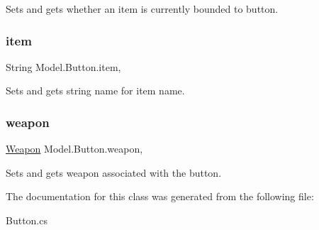 Sets and gets whether an item is currently bounded to button. \hypertarget{class_model_1_1_button_a9aff2e95ee3d23e877593e32a40e99bf}{}\label{class_model_1_1_button_a9aff2e95ee3d23e877593e32a40e99bf} 
\subsubsection{\texorpdfstring{item}{item}}
{\footnotesize\ttfamily String Model.\+Button.\+item\hspace{0.3cm}{\ttfamily [get]}, {\ttfamily [set]}}

Sets and gets string name for item name. \hypertarget{class_model_1_1_button_af435b2d384ae925bfeb6bda7c49db402}{}\label{class_model_1_1_button_af435b2d384ae925bfeb6bda7c49db402} 
\subsubsection{\texorpdfstring{weapon}{weapon}}
{\footnotesize\ttfamily \hyperlink{interface_model_1_1_weapon_module_1_1_weapon}{Weapon} Model.\+Button.\+weapon\hspace{0.3cm}{\ttfamily [get]}, {\ttfamily [set]}}

Sets and gets weapon associated with the button. 

The documentation for this class was generated from the following file\+:\begin{DoxyCompactItemize}
\item 
Button.\+cs\end{DoxyCompactItemize}
